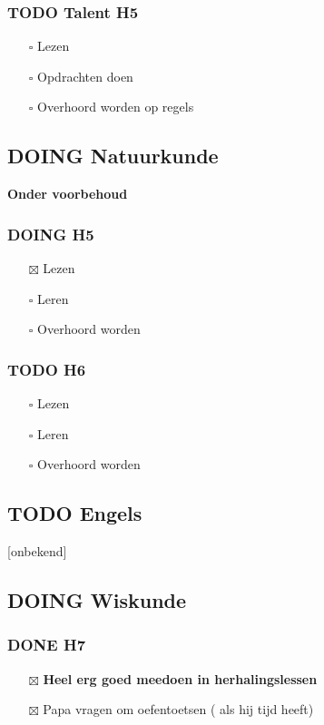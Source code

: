 \documentclass[11pt]{article}
\begin{document}
\subsubsection{{\bfseries\sffamily TODO} Talent H5}
\label{sec:orgc84ccf1}
\begin{itemize}
\item[{$\square$}] Lezen
\item[{$\square$}] Opdrachten doen
\item[{$\square$}] Overhoord worden op regels
\end{itemize}

\subsection{{\bfseries\sffamily DOING} Natuurkunde}
\label{sec:org6c71cb5}
\textbf{Onder voorbehoud}
\subsubsection{{\bfseries\sffamily DOING} H5}
\label{sec:org80eedcf}
\begin{itemize}
\item[{$\boxtimes$}] Lezen
\item[{$\square$}] Leren
\item[{$\square$}] Overhoord worden
\end{itemize}
\subsubsection{{\bfseries\sffamily TODO} H6}
\label{sec:orgb55c121}
\begin{itemize}
\item[{$\square$}] Lezen
\item[{$\square$}] Leren
\item[{$\square$}] Overhoord worden
\end{itemize}

\subsection{{\bfseries\sffamily TODO} Engels}
\label{sec:org5245b52}
[onbekend]
\subsection{{\bfseries\sffamily DOING} Wiskunde}
\label{sec:orgf6dc420}
\subsubsection{{\bfseries\sffamily DONE} H7}
\label{sec:org20f5985}
\begin{itemize}
\item[{$\boxtimes$}] \textbf{Heel erg goed meedoen in herhalingslessen}
\item[{$\boxtimes$}] Papa vragen om oefentoetsen ( als hij tijd heeft)
\end{itemize}
\end{document}

